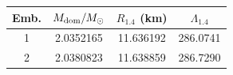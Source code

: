 \begin{tabular}{cccc}
\hline\hline
Emb. & $M_{\rm dom}/M_\odot$ & $R_{1.4}$ (km) & $\Lambda_{1.4}$ \\
\hline
1 & 2.0352165 & 11.636192 & 286.0741 \\
2 & 2.0380823 & 11.638859 & 286.7290 \\
\hline\hline
\end{tabular}
